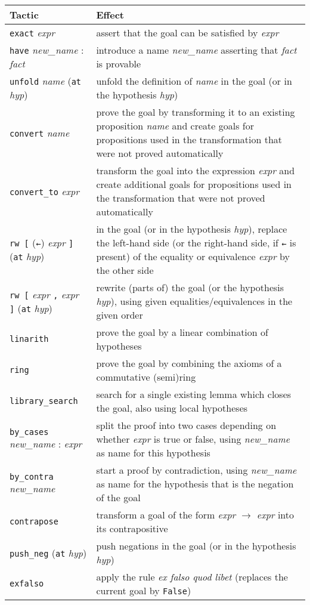 \documentclass[a4paper]{article}
\newcommand{\lean}[1]{{\tt #1}}
\newcommand{\nv}{\textit{new\_name} }
\newcommand{\nom}{\textit{name} }
\newcommand{\expr}{\textit{expr} }
\newcommand{\fait}{\textit{fact} }
\newcommand{\hyp}{\textit{hyp}\xspace}
\begin{document}
\begin{center}
\setlength\tabcolsep{.5cm}
\def\arraystretch{1.6}
\begin{tabular}{@{}lp{10cm}@{}}
  \toprule
  Tactic & Effect \\
  \midrule
  \lean{exact} \expr & assert that the goal can be satisfied by \expr \\
  \lean{have} \nv : \fait & introduce a name \nv asserting that \fait is provable \\
  \lean{unfold} \nom (\lean{at} \hyp) & unfold the definition of \nom in the goal
  (or in the hypothesis \hyp) \\
  \lean{convert} \nom & prove the goal by transforming it to an existing proposition \nom and create goals for propositions used in the transformation that were not proved automatically \\
  \lean{convert\_to} \expr & transform the goal into the expression \expr and create additional goals for propositions used in the transformation that were not proved automatically \\
  \lean{rw [} (\lean{←}) \expr\lean{]} (\lean{at} \hyp) & in the goal (or in the
  hypothesis \hyp), replace the left-hand side
  (or the right-hand side, if \lean{←} is present)
  of the equality or equivalence \expr by the other side \\
  \lean{rw [} \expr\lean{,} \expr\lean{]} (\lean{at} \hyp) & rewrite (parts of) the goal (or the
  hypothesis \hyp), using given equalities/equivalences in the given order \\
  \lean{linarith} & prove the goal by a linear combination of hypotheses \\
  \lean{ring} & prove the goal by combining the axioms of a commutative (semi)ring \\
  \lean{library\_search} & search for a single existing lemma which closes the goal, also using local hypotheses \\
  \lean{by\_cases} \nv : \expr & split the proof into two cases
  depending on whether \expr is true or false,
  using \nv as name for this hypothesis \\
  \lean{by\_contra} \nv & start a proof by contradiction,
  using \nv as name for the hypothesis that is the negation of the goal \\
  \lean{contrapose} & transform a goal of the form \expr $\to$ \expr
  into its contrapositive \\
  \lean{push\_neg} (\lean{at} \hyp) & push negations in the goal
  (or in the hypothesis \hyp) \\
  \lean{exfalso} & apply the rule \emph{ex falso quod libet} (replaces the current goal by \lean{False}) \\
  \bottomrule
\end{tabular}
\end{center}
\end{document}
